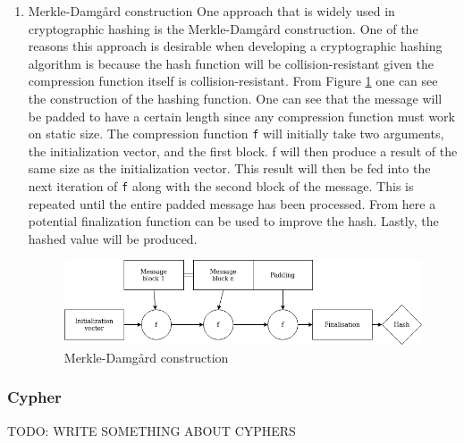 \documentclass[a4paper]{article}
\begin{document}
\begin{enumerate}
\item Merkle-Damgård construction
\label{sec:org663afbc}
One approach that is widely used in cryptographic hashing is the Merkle-Damgård construction. One of the reasons this approach is desirable when developing a cryptographic hashing algorithm is because the hash function will be collision-resistant given the compression function itself is collision-resistant.
From Figure \ref{fig:Merkle} one can see the construction of the hashing function. One can see that the message will be padded to have a certain length since any compression function must work on static size. The compression function \texttt{f} will initially take two arguments, the initialization vector, and the first block. f will then produce a result of the same size as the initialization vector. This result will then be fed into the next iteration of \texttt{f} along with the second block of the message. This is repeated until the entire padded message has been processed. From here a potential finalization function can be used to improve the hash. Lastly, the hashed value will be produced.

\begin{figure}[htbp]
\centering
\includegraphics[width=.9\linewidth]{Background/merkle.png}
\caption{\label{fig:Merkle}Merkle-Damgård construction}
\end{figure}
\end{enumerate}
\subsubsection{Cypher}
\label{sec:org6b927f3}
TODO: WRITE SOMETHING ABOUT CYPHERS
\end{document}
